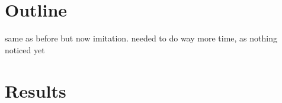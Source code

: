 \section{Outline}
same as before but now imitation. needed to do way more time, as nothing noticed yet

\section{Results}

